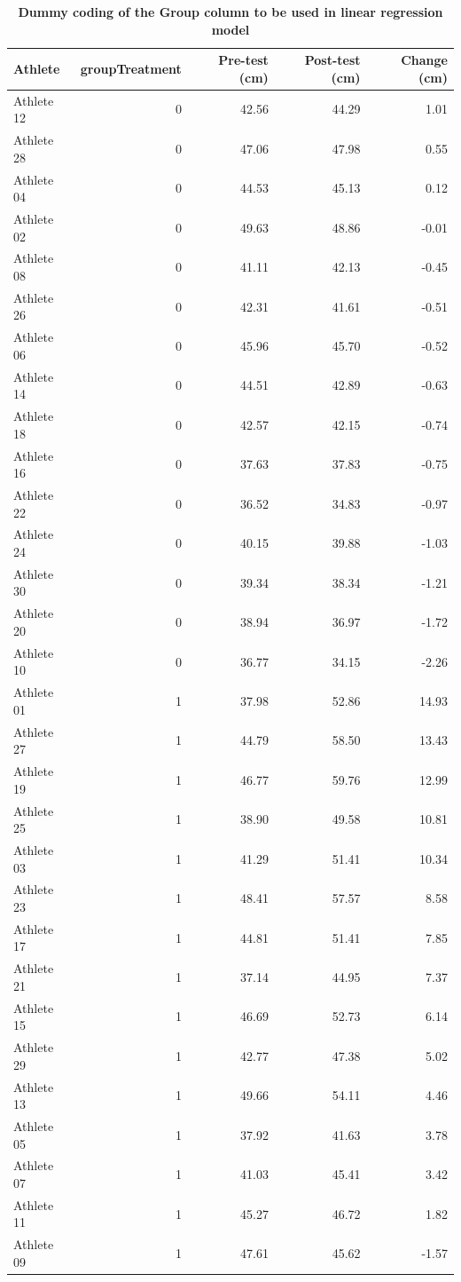 \documentclass[
]{book}
\begin{document}
\begin{table}

\caption{\label{tab:dummy-coded}\textbf{Dummy coding of the Group column to be used in linear regression model}}
\centering
\begin{tabular}[t]{lrrrr}
\toprule
Athlete & groupTreatment & Pre-test (cm) & Post-test (cm) & Change (cm)\\
\midrule
Athlete 12 & 0 & 42.56 & 44.29 & 1.01\\
Athlete 28 & 0 & 47.06 & 47.98 & 0.55\\
Athlete 04 & 0 & 44.53 & 45.13 & 0.12\\
Athlete 02 & 0 & 49.63 & 48.86 & -0.01\\
Athlete 08 & 0 & 41.11 & 42.13 & -0.45\\
\addlinespace
Athlete 26 & 0 & 42.31 & 41.61 & -0.51\\
Athlete 06 & 0 & 45.96 & 45.70 & -0.52\\
Athlete 14 & 0 & 44.51 & 42.89 & -0.63\\
Athlete 18 & 0 & 42.57 & 42.15 & -0.74\\
Athlete 16 & 0 & 37.63 & 37.83 & -0.75\\
\addlinespace
Athlete 22 & 0 & 36.52 & 34.83 & -0.97\\
Athlete 24 & 0 & 40.15 & 39.88 & -1.03\\
Athlete 30 & 0 & 39.34 & 38.34 & -1.21\\
Athlete 20 & 0 & 38.94 & 36.97 & -1.72\\
Athlete 10 & 0 & 36.77 & 34.15 & -2.26\\
\addlinespace
Athlete 01 & 1 & 37.98 & 52.86 & 14.93\\
Athlete 27 & 1 & 44.79 & 58.50 & 13.43\\
Athlete 19 & 1 & 46.77 & 59.76 & 12.99\\
Athlete 25 & 1 & 38.90 & 49.58 & 10.81\\
Athlete 03 & 1 & 41.29 & 51.41 & 10.34\\
\addlinespace
Athlete 23 & 1 & 48.41 & 57.57 & 8.58\\
Athlete 17 & 1 & 44.81 & 51.41 & 7.85\\
Athlete 21 & 1 & 37.14 & 44.95 & 7.37\\
Athlete 15 & 1 & 46.69 & 52.73 & 6.14\\
Athlete 29 & 1 & 42.77 & 47.38 & 5.02\\
\addlinespace
Athlete 13 & 1 & 49.66 & 54.11 & 4.46\\
Athlete 05 & 1 & 37.92 & 41.63 & 3.78\\
Athlete 07 & 1 & 41.03 & 45.41 & 3.42\\
Athlete 11 & 1 & 45.27 & 46.72 & 1.82\\
Athlete 09 & 1 & 47.61 & 45.62 & -1.57\\
\bottomrule
\end{tabular}
\end{table}
\end{document}

